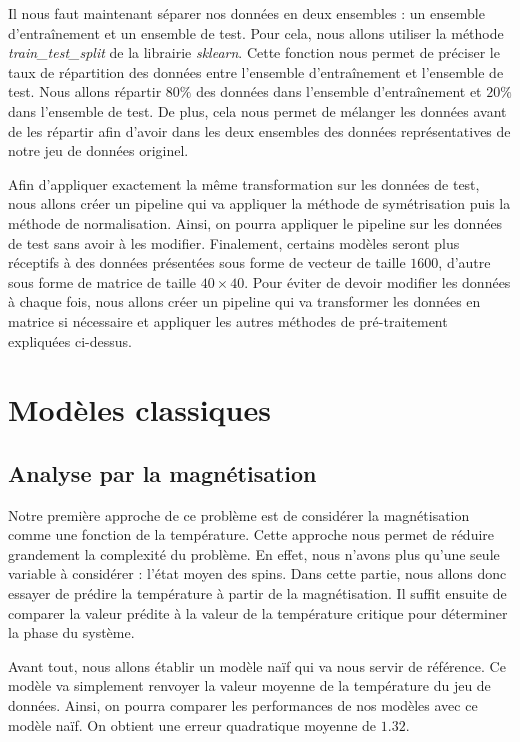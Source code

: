 \documentclass[11pt, parskip=half]{scrartcl} %
\begin{document}
Il nous faut maintenant séparer nos données en deux ensembles : un ensemble d'entraînement et un ensemble de test. Pour cela, nous allons utiliser la méthode \textit{train\_test\_split} de la librairie \textit{sklearn}. Cette fonction nous permet de préciser le taux de répartition des données entre l'ensemble d'entraînement et l'ensemble de test. Nous allons répartir $80\%$ des données dans l'ensemble d'entraînement et $20\%$ dans l'ensemble de test. De plus, cela nous permet de mélanger les données avant de les répartir afin d'avoir dans les deux ensembles des données représentatives de notre jeu de données originel.

Afin d'appliquer exactement la même transformation sur les données de test, nous allons créer un pipeline qui va appliquer la méthode de symétrisation puis la méthode de normalisation. Ainsi, on pourra appliquer le pipeline sur les données de test sans avoir à les modifier.
Finalement, certains modèles seront plus réceptifs à des données présentées sous forme de vecteur de taille $1600$, d'autre sous forme de matrice de taille $40 \times 40$. Pour éviter de devoir modifier les données à chaque fois, nous allons créer un pipeline qui va transformer les données en matrice si nécessaire et appliquer les autres méthodes de pré-traitement expliquées ci-dessus.

\newpage
\section{Modèles classiques}

\subsection{Analyse par la magnétisation}
Notre première approche de ce problème est de considérer la magnétisation comme une fonction de la température. Cette approche nous permet de réduire grandement la complexité du problème. En effet, nous n'avons plus qu'une seule variable à considérer : l'état moyen des spins. Dans cette partie, nous allons donc essayer de prédire la température à partir de la magnétisation. Il suffit ensuite de comparer la valeur prédite à la valeur de la température critique pour déterminer la phase du système.

Avant tout, nous allons établir un modèle naïf qui va nous servir de référence. Ce modèle va simplement renvoyer la valeur moyenne de la température du jeu de données. Ainsi, on pourra comparer les performances de nos modèles avec ce modèle naïf. On obtient une erreur quadratique moyenne de $1.32$.
\end{document}
